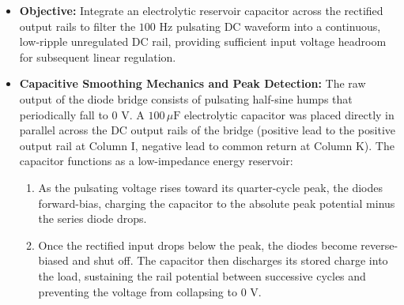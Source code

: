 \documentclass[journal,12pt,onecolumn]{IEEEtran}
\begin{document}
\begin{itemize}
    \item \textbf{Objective:} Integrate an electrolytic reservoir capacitor across the rectified output rails to filter the $100\text{ Hz}$ pulsating DC waveform into a continuous, low-ripple unregulated DC rail, providing sufficient input voltage headroom for subsequent linear regulation.

    \item \textbf{Capacitive Smoothing Mechanics and Peak Detection:} The raw output of the diode bridge consists of pulsating half-sine humps that periodically fall to $0\text{ V}$. A $100\,\mu\text{F}$ electrolytic capacitor was placed directly in parallel across the DC output rails of the bridge (positive lead to the positive output rail at Column I, negative lead to common return at Column K). The capacitor functions as a low-impedance energy reservoir:
    \begin{enumerate}
        \item As the pulsating voltage rises toward its quarter-cycle peak, the diodes forward-bias, charging the capacitor to the absolute peak potential minus the series diode drops.
        \item Once the rectified input drops below the peak, the diodes become reverse-biased and shut off. The capacitor then discharges its stored charge into the load, sustaining the rail potential between successive cycles and preventing the voltage from collapsing to $0\text{ V}$.
    \end{enumerate}


\end{itemize}
\end{document}

